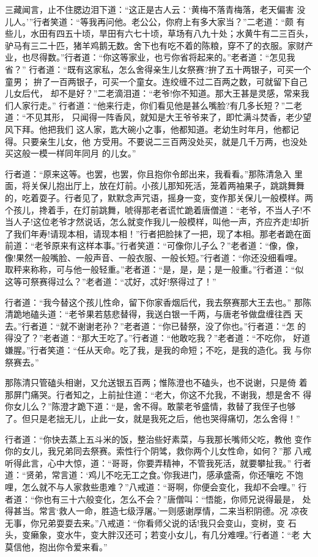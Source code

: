 三藏闻言，止不住腮边泪下道：“这正是古人云：‘黄梅不落青梅落，老天偏害
没儿人。’”行者笑道：“等我再问他。老公公，你府上有多大家当？”二老道：“颇
有些儿，水田有四五十顷，旱田有六七十顷，草场有八九十处；水黄牛有二三百头，
驴马有三二十匹，猪羊鸡鹅无数。舍下也有吃不着的陈粮，穿不了的衣服。家财产
业，也尽得数。”行者道：“你这等家业，也亏你省将起来的。”老者道：“怎见我省？”
行者道：“既有这家私，怎么舍得亲生儿女祭赛?拚了五十两银子，可买一个童男；
拚了一百两银子，可买一个童女。连绞缠不过二百两之数，可就留下自己儿女后代，
却不是好？”二老滴泪道：“老爷!你不知道。那大王甚是灵感，常来我们人家行走。”
行者道：“他来行走，你们看见他是甚么嘴脸?有几多长短？”二老道：“不见其形，
只闻得一阵香风，就知是大王爷爷来了，即忙满斗焚香，老少望风下拜。他把我们
这人家，匙大碗小之事，他都知道。老幼生时年月，他都记得。只要亲生儿女，他
方受用。不要说二三百两没处买，就是几千万两，也没处买这般一模一样同年同月
的儿女。”

行者道：“原来这等。也罢，也罢，你且抱你令郎出来，我看看。”那陈清急入
里面，将关保儿抱出厅上，放在灯前。小孩儿那知死活，笼着两袖果子，跳跳舞舞
的，吃着耍子。行者见了，默默念声咒语，摇身一变，变作那关保儿一般模样。两
个孩儿，搀着手，在灯前跳舞，唬得那老者谎忙跪着唐僧道：“老爷，不当人子!不
当人子!这位老爷才然说话，怎么就变作我儿一般模样，叫他一声，齐应齐走!却折
了我们年寿!请现本相，请现本相！”行者把脸抹了一把，现了本相。那老者跪在面
前道：“老爷原来有这样本事。”行者笑道：“可像你儿子么？”老者道：“像，像，
像!果然一般嘴脸、一般声音、一般衣服、一般长短。”行者道：“你还没细看哩。
取秤来称称，可与他一般轻重。”老者道：“是，是，是；是一般重。”行者道：“似
这等可祭赛得过么？”老者道：“忒好，忒好!祭得过了！”

行者道：“我今替这个孩儿性命，留下你家香烟后代，我去祭赛那大王去也。”
那陈清跪地磕头道：“老爷果若慈悲替得，我送白银一千两，与唐老爷做盘缠往西
天去。”行者道：“就不谢谢老孙？”老者道：“你已替祭，没了你也。”行者道：“怎
的得没了？”老者道：“那大王吃了。”行者道：“他敢吃我？”老者道：“不吃你，
好道嫌腥。”行者笑道：“任从天命。吃了我，是我的命短；不吃，是我的造化。我
与你祭赛去。”

那陈清只管磕头相谢，又允送银五百两；惟陈澄也不磕头，也不说谢，只是倚
着那屏门痛哭。行者知之，上前扯住道：“老大，你这不允我，不谢我，想是舍不
得你女儿么？”陈澄才跪下道：“是，舍不得。敢蒙老爷盛情，救替了我侄子也够
了。但只是老拙无儿，止此一女，就是我死之后，他也哭得痛切，怎么舍得！”

行者道：“你快去蒸上五斗米的饭，整治些好素菜，与我那长嘴师父吃，教他
变作你的女儿，我兄弟同去祭赛。索性行个阴骘，救你两个儿女性命，如何？”那
八戒听得此言，心中大惊，道：“哥哥，你要弄精神，不管我死活，就要攀扯我。”
行者道：“贤弟，常言道：‘鸡儿不吃无工之食。’你我进门，感承盛斋，你还嚷吃
不饱哩，怎么就不与人家救些患难？”八戒道：“哥啊，你便会变化，我却不会哩。”
行者道：“你也有三十六般变化，怎么不会？”唐僧叫：“悟能，你师兄说得最是，
处得甚当。常言‘救人一命，胜造七级浮屠。’一则感谢厚情，二来当积阴德。况
凉夜无事，你兄弟耍耍去来。”八戒道：“你看师父说的话!我只会变山，变树，变
石头，变癞象，变水牛，变大胖汉还可；若变小女儿，有几分难哩。”行者道：“老
大莫信他，抱出你令爱来看。”


